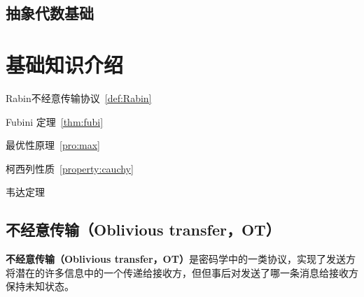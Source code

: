 \documentclass[lang=cn,newtx,10pt,scheme=chinese]{elegantbook}
\begin{document}
\section{抽象代数基础}

\chapter{基础知识介绍}

\begin{introduction}
	\item Rabin不经意传输协议~\ref{def:Rabin}
	\item Fubini 定理~\ref{thm:fubi}
	\item 最优性原理~\ref{pro:max}
	\item 柯西列性质~\ref{property:cauchy}
	\item 韦达定理
\end{introduction}

\section{不经意传输（Oblivious transfer，OT）}
\textbf{不经意传输（Oblivious transfer，OT）}是密码学中的一类协议，实现了发送方将潜在的许多信息中的一个传递给接收方，但但事后对发送了哪一条消息给接收方保持未知状态。
\end{document}
